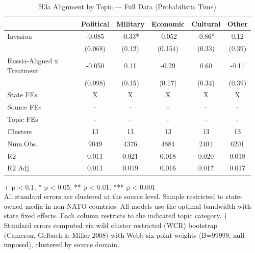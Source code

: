 \begin{table}[t]
\caption{\label{tab:table-s09-fe-topic}H3a Alignment by Topic — Full Data (Probabilistic Time)}
\fontsize{12.0pt}{14.0pt}\selectfont
\begin{tabular*}{\linewidth}{@{\extracolsep{\fill}}lccccc}
\toprule
  & Political & Military & Economic & Cultural & Other \\ 
\midrule\addlinespace[2.5pt]
Invasion & -0.085 & -0.33* & -0.052 & -0.86* & 0.12 \\ 
 & (0.068) & (0.12) & (0.154) & (0.33) & (0.39) \\ 
Russia-Aligned x Treatment & -0.050 & 0.11 & -0.29 & 0.60 & -0.11 \\ 
{} & {(0.098)} & {(0.15)} & {(0.17)} & {(0.34)} & {(0.39)} \\ 
State FEs & X & X & X & X & X \\ 
Source FEs & - & - & - & - & - \\ 
Topic FEs & - & - & - & - & - \\ 
Clusters & 13 & 13 & 13 & 13 & 13 \\ 
Num.Obs. & 9049 & 4376 & 4884 & 2401 & 6201 \\ 
R2 & 0.011 & 0.021 & 0.018 & 0.020 & 0.018 \\ 
R2 Adj. & 0.011 & 0.019 & 0.016 & 0.017 & 0.017 \\ 
\bottomrule
\end{tabular*}
\begin{minipage}{\linewidth}
\vspace{.05em}
+ p < 0.1, * p < 0.05, ** p < 0.01, *** p < 0.001\\
All standard errors are clustered at the source level. Sample restricted to
state-owned media in non-NATO countries. All models use the optimal bandwidth
with state fixed effects. Each column restricts to the indicated topic category.
† Standard errors computed via wild cluster restricted (WCR) bootstrap (Cameron,
Gelbach \& Miller 2008) with Webb six-point weights (B=99999, null imposed),
clustered by source domain.\\
\end{minipage}
\end{table}

